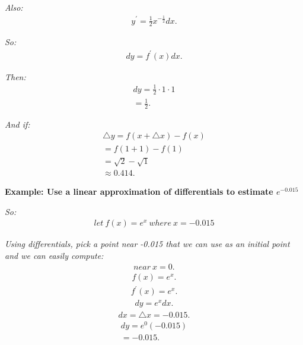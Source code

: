 \documentclass{report}
\begin{document}
    \bigbreak \noindent 
    \textit{Also:}
    \begin{align*}
      y^{\prime} = \frac{1}{2}x^{-\frac{1}{2}}dx
    .\end{align*}

    \bigbreak \noindent 
    \textit{So:}
    \begin{align*}
      dy = f^{\prime}(x)dx
    .\end{align*}

    \bigbreak \noindent 
    \textit{Then:}
    \begin{align*}
      dy = \frac{1}{2} \cdot 1 \cdot 1 \\
      = \frac{1}{2}
    .\end{align*}

    \bigbreak \noindent 
    \textit{And if:}
    \begin{align*}
      \triangle y = f(x + \triangle x) - f(x) \\ 
      = f(1+1) - f(1) \\
      = \sqrt{2} - \sqrt{1} \\
      \approx 0.414
    .\end{align*}

    \bigbreak \noindent 
    \begin{mdframed}
      \textbf{Example: Use a linear approximation of differentials to estimate $e^{-0.015}$}
    \end{mdframed}
    \bigbreak \noindent
    \textit{So:}
    \begin{align*}
      let\ f(x) = e^{x}\ where\ x=-0.015
    \end{align*}

    \bigbreak \noindent 
    \textit{Using differentials, pick a point near -0.015 that we can use as an initial point and we can easily compute:}
    \begin{align*}
      near\ x= 0
    .\end{align*}
    \begin{align*}
      f(x) = e^{x} 
    .\end{align*}
    \begin{align*}
      f^{\prime}(x) = e^{x}
    .\end{align*}
    \begin{align*}
      dy = e^{x}dx
    .\end{align*}
    \begin{align*}
      dx = \triangle x = -0.015
    .\end{align*}
    \begin{align*}
      dy = e^{0} (-0.015) \\
      = -0.015
    .\end{align*}
\end{document}
